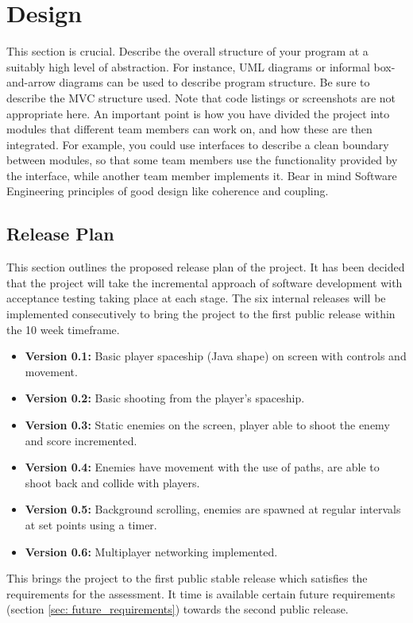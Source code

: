 
\chapter{Design}
\label{cha:design}

This section is crucial. Describe the overall structure of your
program at a suitably high level of abstraction. For instance, UML
diagrams or informal box-and-arrow diagrams can be used to describe
program structure. Be sure to describe the MVC structure used. Note
that code listings or screenshots are not appropriate here. An
important point is how you have divided the project into modules
that different team members can work on, and how these are then
integrated. For example, you could use interfaces to describe a
clean boundary between modules, so that some team members use the
functionality provided by the interface, while another team member
implements it. Bear in mind Software Engineering principles of good
design like coherence and coupling.

\section{Release Plan}
\label{sec: release_plan}
This section outlines the proposed release plan of the project. It has been decided that the project will take the incremental approach of software development with acceptance testing taking place at each stage. The six internal releases will be implemented consecutively to bring the project to the first public release within the 10 week timeframe.

\begin{itemize}
\item \textbf{Version 0.1:} Basic player spaceship (Java shape) on screen with controls and movement.
\item \textbf{Version 0.2:} Basic shooting from the player's spaceship.
\item \textbf{Version 0.3:} Static enemies on the screen, player able to shoot the enemy and score incremented.
\item \textbf{Version 0.4:} Enemies have movement with the use of paths, are able to shoot back and collide with players.
\item \textbf{Version 0.5:} Background scrolling, enemies are spawned at regular intervals at set points using a timer.
\item \textbf{Version 0.6:} Multiplayer networking implemented.
\end{itemize} This brings the project to the first public stable release which satisfies the requirements for the assessment. It time is available certain future requirements (section \ref{sec: future_requirements}) towards the second public release.

